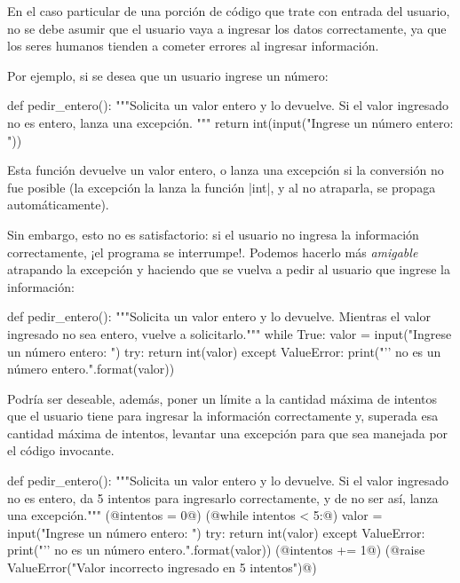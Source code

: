 En el caso particular de una porción de código que trate con entrada del
usuario, no se debe asumir que el usuario vaya a ingresar los datos
correctamente, ya que los seres humanos tienden a cometer errores al ingresar
información.

Por ejemplo, si se desea que un usuario ingrese un número:

\begin{codigo-python-sn}
def pedir_entero():
    """Solicita un valor entero y lo devuelve.
    Si el valor ingresado no es entero, lanza una excepción.
    """
    return int(input("Ingrese un número entero: "))
\end{codigo-python-sn}

Esta función devuelve un valor entero, o lanza una excepción si la conversión
no fue posible (la excepción la lanza la función |int|, y al no atraparla, se
propaga automáticamente).

Sin embargo, esto no es satisfactorio: si el usuario no ingresa la información
correctamente, ¡el programa se interrumpe!. Podemos hacerlo más \emph{amigable}
atrapando la excepción y haciendo que se vuelva a pedir al usuario que ingrese
la información:

\begin{codigo-python-sn}
def pedir_entero():
    """Solicita un valor entero y lo devuelve.
    Mientras el valor ingresado no sea entero, vuelve a solicitarlo."""
    while True:
        valor = input("Ingrese un número entero: ")
        try:
            return int(valor)
        except ValueError:
            print("'{}' no es un número entero.".format(valor))
\end{codigo-python-sn}

Podría ser deseable, además, poner un límite a la cantidad máxima de intentos
que el usuario tiene para ingresar la información correctamente y, superada
esa cantidad máxima de intentos, levantar una excepción para que sea manejada
por el código invocante.

\begin{codigo-python-sn}
def pedir_entero():
    """Solicita un valor entero y lo devuelve.
    Si el valor ingresado no es entero, da 5 intentos para ingresarlo
    correctamente, y de no ser así, lanza una excepción."""
    (@intentos = 0@)
    (@while intentos < 5:@)
        valor = input("Ingrese un número entero: ")
        try:
            return int(valor)
        except ValueError:
            print("'{}' no es un número entero.".format(valor))
            (@intentos += 1@)
    (@raise ValueError("Valor incorrecto ingresado en 5 intentos")@)
\end{codigo-python-sn}

